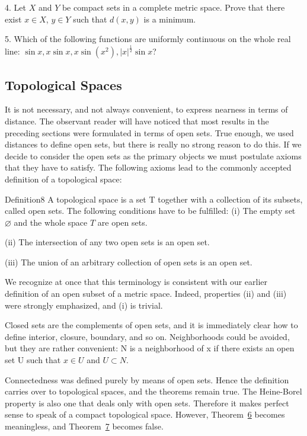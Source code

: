 4. Let $X$ and $Y$ be compact sets in a complete metric space. Prove that there exist $x \in X$, $y \in Y$ such that $d(x, y)$ is a minimum.

5. Which of the following functions are uniformly continuous on the whole real line: $\sin x, x \sin x, x \sin (x^2), |x|^{\frac{1}{2}} \sin x$?

\setcounter{section}{1}\setcounter{subsection}{5}\subsection{Topological Spaces}\label{sec:3.1.6}
It is not necessary, and not always convenient, to express nearness in terms of distance. The observant reader will have noticed that most results in the preceding sections were formulated in terms of open sets. True enough, we used distances to define open sets, but there is really no strong reason to do this. If we decide to consider the open sets as the primary objects we must postulate axioms that they have to satisfy. The following axioms lead to the commonly accepted definition of a topological space:

\begin{originalstatement}{Definition}{8}\label{def:3.8}
A topological space is a set T together with a collection of its subsets, called open sets. The following conditions have to be fulfilled:
(i) The empty set $\varnothing$ and the whole space $T$ are open sets.

(ii) The intersection of any two open sets is an open set.

(iii) The union of an arbitrary collection of open sets is an open set.
\end{originalstatement}

We recognize at once that this terminology is consistent with our earlier definition of an open subset of a metric space. Indeed, properties (ii) and (iii) were strongly emphasized, and (i) is trivial.

Closed sets are the complements of open sets, and it is immediately clear how to define interior, closure, boundary, and so on. Neighborhoods could be avoided, but they are rather convenient: N is a neighborhood of x if there exists an open set U such that $x \in U$ and $U \subset N$.

Connectedness was defined purely by means of open sets. Hence the definition carries over to topological spaces, and the theorems remain true. The Heine-Borel property is also one that deals only with open sets. Therefore it makes perfect sense to speak of a compact topological space. However, Theorem~\hyperref[thm:3.6]{6} becomes meaningless, and Theorem~\hyperref[thm:3.7]{7} becomes false.

